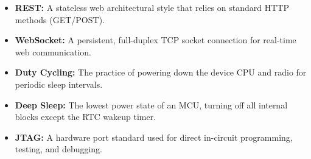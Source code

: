 \documentclass[12pt,a4paper]{article}
\begin{document}
\begin{tcolorbox}[defbox, title={\textbf{One-Line Definitions}}]
\begin{itemize}[leftmargin=*, itemsep=3pt, topsep=0pt]
  \item \textbf{REST:} A stateless web architectural style that relies on standard HTTP methods (GET/POST).
  \item \textbf{WebSocket:} A persistent, full-duplex TCP socket connection for real-time web communication.
  \item \textbf{Duty Cycling:} The practice of powering down the device CPU and radio for periodic sleep intervals.
  \item \textbf{Deep Sleep:} The lowest power state of an MCU, turning off all internal blocks except the RTC wakeup timer.
  \item \textbf{JTAG:} A hardware port standard used for direct in-circuit programming, testing, and debugging.
\end{itemize}
\end{tcolorbox}

\vspace{6pt}
\end{document}
